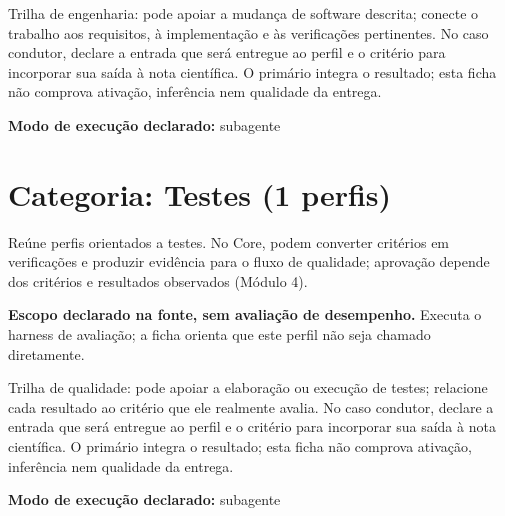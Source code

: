 \begin{funcao}
Trilha de engenharia: pode apoiar a mudança de software descrita; conecte o trabalho aos requisitos, à implementação e às verificações pertinentes. No caso condutor, declare a entrada que será entregue ao perfil e o critério para incorporar sua saída à nota científica. O primário integra o resultado; esta ficha não comprova ativação, inferência nem qualidade da entrega.
\end{funcao}

\begin{arquitetura}
\textbf{Modo de execução declarado:} subagente
\end{arquitetura}

\clearpage
\section{Categoria: Testes (1 perfis)}

\begin{descricao}
Reúne perfis orientados a testes. No Core, podem converter critérios em verificações e produzir evidência para o fluxo de qualidade; aprovação depende dos critérios e resultados observados (Módulo 4).
\end{descricao}


\begin{descricao}
\textbf{Escopo declarado na fonte, sem avaliação de desempenho.}
Executa o harness de avaliação; a ficha orienta que este perfil não seja chamado diretamente.
\end{descricao}

\begin{funcao}
Trilha de qualidade: pode apoiar a elaboração ou execução de testes; relacione cada resultado ao critério que ele realmente avalia. No caso condutor, declare a entrada que será entregue ao perfil e o critério para incorporar sua saída à nota científica. O primário integra o resultado; esta ficha não comprova ativação, inferência nem qualidade da entrega.
\end{funcao}

\begin{arquitetura}
\textbf{Modo de execução declarado:} subagente
\end{arquitetura}

